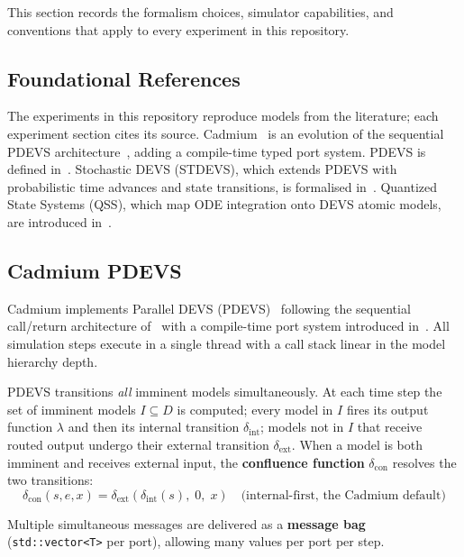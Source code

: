This section records the formalism choices, simulator capabilities, and
conventions that apply to every experiment in this repository.

\subsection*{Foundational References}

The experiments in this repository reproduce models from the literature;
each experiment section cites its source.  Cadmium~\cite{VWRB19} is an
evolution of the sequential PDEVS architecture~\cite{VNWD15}, adding a
compile-time typed port system.  PDEVS is defined in~\cite{ZPK00}.
Stochastic DEVS (STDEVS), which extends PDEVS with probabilistic time
advances and state transitions, is formalised in~\cite{CKW10}.
Quantized State Systems (QSS), which map ODE integration onto DEVS
atomic models, are introduced in~\cite{K04}.

\subsection*{Cadmium PDEVS}

Cadmium implements Parallel DEVS (PDEVS)~\cite{ZPK00} following the
sequential call/return architecture of~\cite{VNWD15} with a compile-time
port system introduced in~\cite{VWRB19}.  All simulation steps execute
in a single thread with a call stack linear in the model hierarchy depth.

PDEVS transitions \emph{all} imminent models simultaneously.  At each
time step the set of imminent models $I \subseteq D$ is computed; every
model in $I$ fires its output function $\lambda$ and then its internal
transition $\delta_{\text{int}}$; models not in $I$ that receive routed
output undergo their external transition $\delta_{\text{ext}}$.  When a
model is both imminent and receives external input, the
\textbf{confluence function} $\delta_{\text{con}}$ resolves the two
transitions:
\[
  \delta_{\text{con}}(s, e, x) =
    \delta_{\text{ext}}\!\left(\delta_{\text{int}}(s),\; 0,\; x\right)
  \quad \text{(internal-first, the Cadmium default)}
\]

Multiple simultaneous messages are delivered as a \textbf{message bag}
(\texttt{std::vector<T>} per port), allowing many values per port per step.

